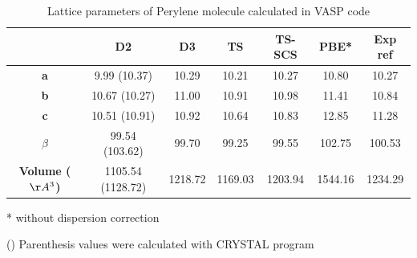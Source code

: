 					\begin{table}[H]
 						\caption{Lattice parameters of Perylene molecule calculated in VASP code} \label{table-perysol}
 						\begin{center}
 							\begin{threeparttable}
 								\begin{tabular}{c c c c c c c}
 									\toprule
 									& \textbf{D2} & \textbf{D3} & \textbf{TS} & \textbf{TS-SCS} & \textbf{PBE*} & \textbf{Exp} ref\cite{nather1998solvent}\\
 									\midrule
 									\textbf{a} & 9.99 (10.37)  & 10.29 & 10.21 & 10.27 & 10.80 &10.27 \\
 									\textbf{b}& 10.67 (10.27) & 11.00 & 10.91 & 10.98 & 11.41 & 10.84\\
 									\textbf{c}& 10.51 (10.91) & 10.92 & 10.64 & 10.83 & 12.85 & 11.28\\
 									\textbf{$\beta$} & 99.54 (103.62) & 99.70 & 99.25 &99.55 & 102.75 & 100.53 \\
 									\textbf{Volume ($\AA^{3}$)}& 1105.54 (1128.72)& 1218.72 & 1169.03 & 1203.94 & 1544.16 & 1234.29\\
 									\bottomrule
 								\end{tabular}
 								
 								\begin{tablenotes}
 									\item[*] without dispersion correction
 									\item[()] Parenthesis values were calculated with CRYSTAL program
 								\end{tablenotes}
 							\end{threeparttable}
 						\end{center}
 					\end{table}
 		

